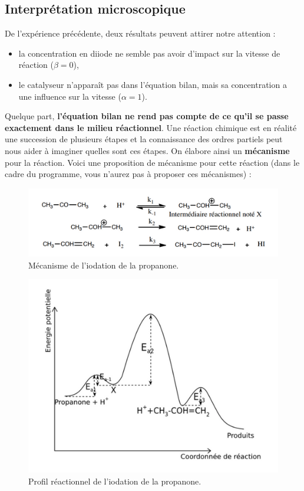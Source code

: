 \documentclass[11pt,a4paper]{report}
\begin{document}
\subsection{Interprétation microscopique}

De l'expérience précédente, deux résultats peuvent attirer notre attention :
\begin{itemize}
	\item la concentration en diiode ne semble pas avoir d'impact sur 
		la vitesse de réaction ($\beta = 0$),
	\item le catalyseur n'apparaît pas dans l'équation bilan, mais sa concentration a une influence 			sur la vitesse ($\alpha = 1$).\\
\end{itemize}

Quelque part, \textbf{l'équation bilan ne rend pas compte de ce qu'il se passe exactement dans le milieu réactionnel}. Une réaction chimique est en réalité une succession de plusieurs étapes et la connaissance des ordres partiels peut nous aider à imaginer quelles sont ces étapes. On élabore ainsi un \textbf{mécanisme} pour la réaction. Voici une proposition de mécanisme pour cette réaction (dans le cadre du programme, vous n'aurez pas à proposer ces mécanismes) :

\begin{figure}[h!]
	\begin{center}
  		\includegraphics[scale = 0.7]{iodation_propanone.png}
	\caption{Mécanisme de l'iodation de la propanone.}
	\end{center}
\end{figure}
\begin{figure}[h!]
	\begin{center}
  		\includegraphics[scale = 0.6]{profil_reac.png}
	\caption{Profil réactionnel de l'iodation de la propanone.}
	\end{center}
\end{figure}
\end{document}
